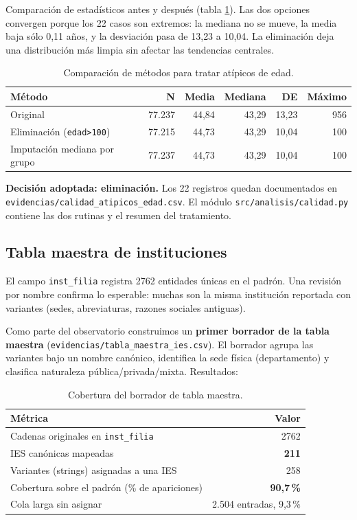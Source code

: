 \documentclass[11pt,a4paper,oneside]{article}
\begin{document}
Comparación de estadísticos antes y después (tabla \ref{tab:edad-comp}). Las dos opciones convergen porque los 22 casos son extremos: la mediana no se mueve, la media baja sólo 0{,}11 años, y la desviación pasa de 13{,}23 a 10{,}04. La eliminación deja una distribución más limpia sin afectar las tendencias centrales.

\begin{table}[h]
\centering
\caption{Comparación de métodos para tratar atípicos de edad.}
\label{tab:edad-comp}
\small
\begin{tabular}{l r r r r r}
\toprule
\textbf{Método} & \textbf{N} & \textbf{Media} & \textbf{Mediana} & \textbf{DE} & \textbf{Máximo} \\
\midrule
Original                       & 77.237 & 44{,}84 & 43{,}29 & 13{,}23 & 956 \\
Eliminación (\texttt{edad>100}) & 77.215 & 44{,}73 & 43{,}29 & 10{,}04 & 100 \\
Imputación mediana por grupo   & 77.237 & 44{,}73 & 43{,}29 & 10{,}04 & 100 \\
\bottomrule
\end{tabular}
\end{table}

\textbf{Decisión adoptada: eliminación.} Los 22 registros quedan documentados en \texttt{evidencias/calidad\_atipicos\_edad.csv}. El módulo \texttt{src/analisis/calidad.py} contiene las dos rutinas y el resumen del tratamiento.

\subsection{Tabla maestra de instituciones}\label{ssec:tabla-maestra}

El campo \texttt{inst\_filia} registra \num{2762} entidades únicas en el padrón. Una revisión por nombre confirma lo esperable: muchas son la misma institución reportada con variantes (sedes, abreviaturas, razones sociales antiguas).

Como parte del observatorio construimos un \textbf{primer borrador de la tabla maestra} (\texttt{evidencias/tabla\_maestra\_ies.csv}). El borrador agrupa las variantes bajo un nombre canónico, identifica la sede física (departamento) y clasifica naturaleza pública/privada/mixta. Resultados:

\begin{table}[h]
\centering
\caption{Cobertura del borrador de tabla maestra.}
\small
\begin{tabular}{l r}
\toprule
\textbf{Métrica} & \textbf{Valor} \\
\midrule
Cadenas originales en \texttt{inst\_filia} & \num{2762} \\
IES canónicas mapeadas & \textbf{211} \\
Variantes (strings) asignadas a una IES & 258 \\
Cobertura sobre el padrón (\% de apariciones) & \textbf{90{,}7\,\%} \\
Cola larga sin asignar & 2.504 entradas, 9{,}3\,\% \\
\bottomrule
\end{tabular}
\end{table}
\end{document}

